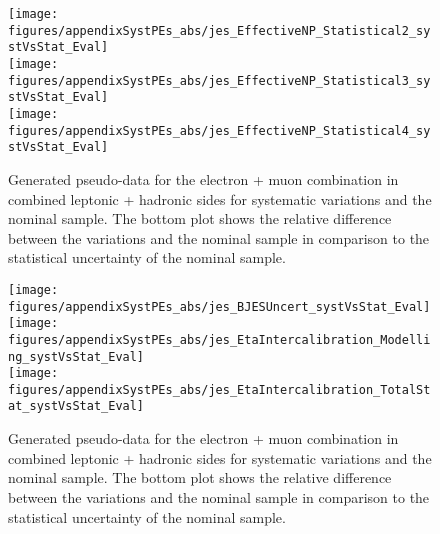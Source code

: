 \begin{figure}[!hb]
\begin{center}
        \texttt{[image: figures/appendixSystPEs\_abs/jes\_EffectiveNP\_Statistical2\_systVsStat\_Eval]}\\
        \texttt{[image: figures/appendixSystPEs\_abs/jes\_EffectiveNP\_Statistical3\_systVsStat\_Eval]}\\
        \texttt{[image: figures/appendixSystPEs\_abs/jes\_EffectiveNP\_Statistical4\_systVsStat\_Eval]}
\caption{Generated pseudo-data for the electron + muon combination in combined leptonic + hadronic sides for systematic variations and the nominal \ttbar sample. The bottom plot shows the relative difference between the variations and the nominal sample in comparison to the statistical uncertainty of the nominal sample.}   
\label{fig:systematicVar_lephad_JES_3_2}
\end{center}
\end{figure}        
\begin{figure}[!hb]
\begin{center}
        \texttt{[image: figures/appendixSystPEs\_abs/jes\_BJESUncert\_systVsStat\_Eval]}\\
        \texttt{[image: figures/appendixSystPEs\_abs/jes\_EtaIntercalibration\_Modelling\_systVsStat\_Eval]}\\
        \texttt{[image: figures/appendixSystPEs\_abs/jes\_EtaIntercalibration\_TotalStat\_systVsStat\_Eval]}
\caption{Generated pseudo-data for the electron + muon combination in combined leptonic + hadronic sides for systematic variations and the nominal \ttbar sample. The bottom plot shows the relative difference between the variations and the nominal sample in comparison to the statistical uncertainty of the nominal sample.}   
\label{fig:systematicVar_lephad_JES_4_1}
\end{center}
\end{figure}

